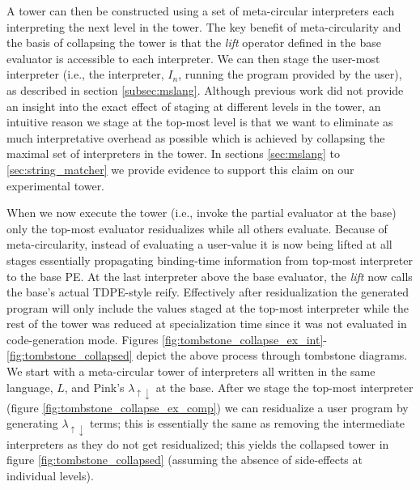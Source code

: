 \documentclass[a4paper,12pt,twoside,openright]{report}
\theoremstyle{definition}
\newcommand{\mslang}{$\lambda_{\uparrow\downarrow}$}
\begin{document}
A tower can then be constructed using a set of meta-circular interpreters each interpreting the next level in the tower. The key benefit of meta-circularity and the basis of collapsing the tower is that the \textit{lift} operator defined in the base evaluator is accessible to each interpreter. We can then stage the user-most interpreter (i.e., the interpreter, $I_n$, running the program provided by the user), as described in section \ref{subsec:mslang}. Although previous work did not provide an insight into the exact effect of staging at different levels in the tower, an intuitive reason we stage at the top-most level is that we want to eliminate as much interpretative overhead as possible which is achieved by collapsing the maximal set of interpreters in the tower. In sections \ref{sec:mslang} to \ref{sec:string_matcher} we provide evidence to support this claim on our experimental tower.

When we now execute the tower (i.e., invoke the partial evaluator at the base) only the top-most evaluator residualizes while all others evaluate. Because of meta-circularity, instead of evaluating a user-value it is now being lifted at all stages essentially propagating binding-time information from top-most interpreter to the base PE. At the last interpreter above the base evaluator, the \textit{lift} now calls the base's actual TDPE-style reify. Effectively after residualization the generated program will only include the values staged at the top-most interpreter while the rest of the tower was reduced at specialization time since it was not evaluated in code-generation mode. Figures \ref{fig:tombstone_collapse_ex_int}-\ref{fig:tombstone_collapsed} depict the above process through tombstone diagrams. We start with a meta-circular tower of interpreters all written in the same language, $L$, and Pink's \mslang{} at the base. After we stage the top-most interpreter (figure \ref{fig:tombstone_collapse_ex_comp}) we can residualize a user program by generating \mslang{} terms; this is essentially the same as removing the intermediate interpreters as they do not get residualized; this yields the collapsed tower in figure \ref{fig:tombstone_collapsed} (assuming the absence of side-effects at individual levels).
\end{document}
